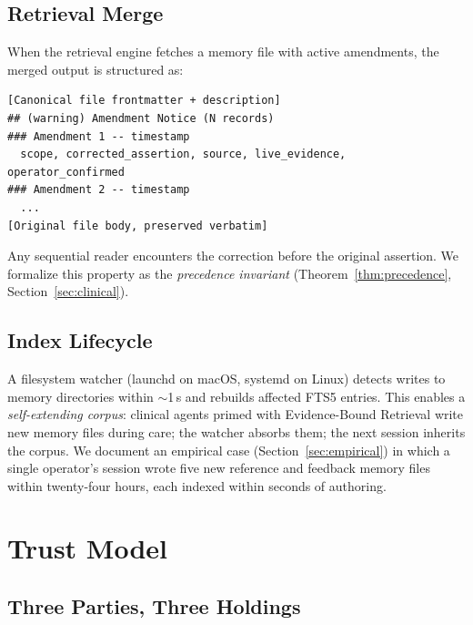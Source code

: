 \documentclass[runningheads]{llncs}
\begin{document}
\subsection{Retrieval Merge}

When the retrieval engine fetches a memory file with active amendments,
the merged output is structured as:

\begin{verbatim}
[Canonical file frontmatter + description]
## (warning) Amendment Notice (N records)
### Amendment 1 -- timestamp
  scope, corrected_assertion, source, live_evidence, operator_confirmed
### Amendment 2 -- timestamp
  ...
[Original file body, preserved verbatim]
\end{verbatim}

Any sequential reader encounters the correction before the original
assertion. We formalize this property as the \emph{precedence invariant}
(Theorem~\ref{thm:precedence}, Section~\ref{sec:clinical}).

\subsection{Index Lifecycle}

A filesystem watcher (launchd on macOS, systemd on Linux) detects writes
to memory directories within $\sim$1\,s and rebuilds affected FTS5 entries.
This enables a \emph{self-extending corpus}: clinical agents primed with
Evidence-Bound Retrieval write new memory files during care; the watcher
absorbs them; the next session inherits the corpus. We document an empirical
case (Section~\ref{sec:empirical}) in which a single operator's session
wrote five new reference and feedback memory files within twenty-four hours,
each indexed within seconds of authoring.

\section{Trust Model}
\label{sec:trust}

\subsection{Three Parties, Three Holdings}
\end{document}
